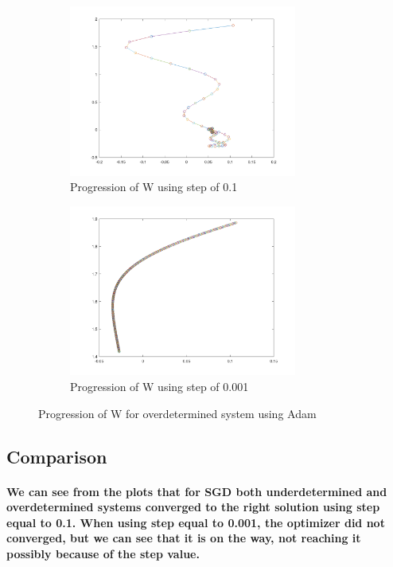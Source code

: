 \documentclass[a4paper]{article}    %
\begin{document}
\begin{figure}[H]
    \centering
    \begin{subfigure}{0.48\textwidth}
        \centering
        \includegraphics[width=7.5cm]{adam_over_step_0_1}
        \caption{Progression of W using step of 0.1}
        \label{fig:adam-over-0_1}
    \end{subfigure}
    \hfill
    \begin{subfigure}{0.48\textwidth}
        \centering
        \includegraphics[width=7.5cm]{adam_over_step_0_001}
        \caption{Progression of W using step of 0.001}
        \label{fig:adam-over-0_001}
    \end{subfigure}
    \hfill
    \caption{Progression of W for overdetermined system using Adam}
    \label{fig:adam-over}
\end{figure}

\newpage

\subsection{Comparison}

\paragraph{We can see from the plots that for SGD both underdetermined and overdetermined systems converged to the right solution using step equal to 0.1. When using step equal to 0.001, the optimizer did not converged, but we can see that it is on the way, not reaching it possibly because of the step value.}
\end{document}
